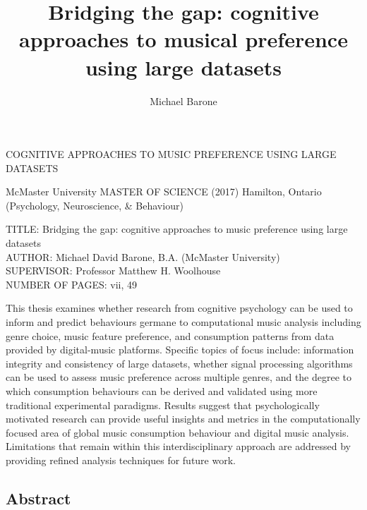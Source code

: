 \documentclass[a4paper]{article}
\title{Bridging the gap: cognitive approaches to musical preference using large datasets}
\author{Michael Barone}
\begin{document}
\vspace*{\fill}
\begin{center}
COGNITIVE APPROACHES TO MUSIC PREFERENCE USING LARGE DATASETS
\end{center}
\vspace*{\fill}

\newpage
\maketitle
\newpage

\setcounter{page}{2}
\vspace*{\fill}
\begin{flushleft}
McMaster University MASTER OF SCIENCE (2017) Hamilton, Ontario (Psychology, Neuroscience, \& Behaviour)
\newline

TITLE: Bridging the gap: cognitive approaches to music preference using large datasets\\
AUTHOR: Michael David Barone, B.A. (McMaster University) \\
SUPERVISOR: Professor Matthew H. Woolhouse \\
NUMBER OF PAGES: vii, 49
\end{flushleft}
\vspace*{\fill}

\newpage

\vspace*{\fill}
This thesis examines whether research from cognitive psychology can be used to inform and predict behaviours germane to computational music analysis including genre choice, music feature preference, and consumption patterns from data provided by digital-music platforms. Specific topics of focus include: information integrity and consistency of large datasets, whether signal processing algorithms can be used to assess music preference across multiple genres, and the degree to which consumption behaviours can be derived and validated using more traditional experimental paradigms. Results suggest that psychologically motivated research can provide useful insights and metrics in the computationally focused area of global music consumption behaviour and digital music analysis. Limitations that remain within this interdisciplinary approach are addressed by providing refined analysis techniques for future work.
\vspace*{\fill}

\newpage
\vspace*{\fill}
\begin{center}
\section*{Abstract}
\end{center}
\end{document}
